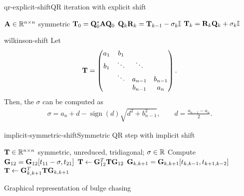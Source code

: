 \begin{Algorithm*}{qr-explicit-shift}{QR iteration with explicit shift}
  \begin{algorithmic}[1]
    \Require $\mathbf A\in\mathbb R^{n\times n}$ symmetric
    \State $\mathbf T_0 = \mathbf Q_0^*\mathbf A\mathbf Q_0$
    \State $\mathbf Q_k\mathbf R_k = \mathbf T_{k-1} - \sigma_k\mathbb I$
    \State $\mathbf T_{k} = \mathbf R_k\mathbf Q_k + \sigma_k\mathbb I$
    \EndFor
  \end{algorithmic}
\end{Algorithm*}

\begin{Lemma}{wilkinson-shift}
  Let
  \begin{gather}
    \mathbf T =
    \begin{pmatrix}
      a_1&b_1\\
      b_1&\ddots&\ddots\\
      &\ddots&a_{n-1}&b_{n-1}\\
      &&b_{n-1}&a_n
    \end{pmatrix}.
  \end{gather}
  Then, the  $\sigma$ can be computed as
  \begin{gather}
    \sigma = a_n + d - \operatorname{sign}(d) \sqrt{d^2+b_{n-1}^2},
    \qquad d=\frac{a_{n-1}-a_n}2.
  \end{gather}
\end{Lemma}

\begin{Algorithm*}{implicit-symmetric-shift}{Symmetric QR step with implicit shift}
  \begin{algorithmic}[1]
    \Require $\mathbf T\in\mathbb R^{n\times n}$ symmetric, unreduced, tridiagonal; $\sigma\in\mathbb R$
    \State Compute $\mathbf G_{12} = \mathbf G_{12}[t_{11}-\sigma,t_{21}]$
    \State $\mathbf T \gets \mathbf G_{12}^T\mathbf T\mathbf G_{12}$
     
    \State $\mathbf G_{k,k+1} = \mathbf G_{k,k+1}[t_{k,k-1},t_{k+1,k-2}]$
    \State $\mathbf T \gets \mathbf G_{k,k+1}^T\mathbf T\mathbf G_{k,k+1}$
    \EndFor
  \end{algorithmic}
\end{Algorithm*}

\begin{example}
  \begin{todo}
    Graphical representation of bulge chasing
  \end{todo}
\end{example}

